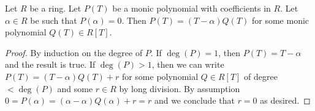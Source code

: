 \begin{lemma}
\label{lemma-have-one-root}
Let $R$ be a ring. Let $P(T)$ be a monic polynomial with coefficients
in $R$. Let $\alpha \in R$ be such that $P(\alpha) = 0$. Then
$P(T) = (T - \alpha)Q(T)$ for some monic polynomial $Q(T) \in R[T]$.
\end{lemma}

\begin{proof}
By induction on the degree of $P$. If $\deg(P) = 1$, then
$P(T) = T - \alpha$ and the result is true. If $\deg(P) > 1$, then
we can write $P(T) = (T - \alpha)Q(T) + r$ for some polynomial
$Q \in R[T]$ of degree $< \deg(P)$ and some $r \in R$ by long
division. By assumption $0 = P(\alpha) = (\alpha - \alpha)Q(\alpha) + r = r$
and we conclude that $r = 0$ as desired.
\end{proof}
